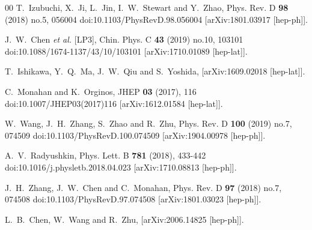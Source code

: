 \documentclass[preprint,12pt]{elsarticle}
\begin{document}
\begin{thebibliography}{00}
T.~Izubuchi, X.~Ji, L.~Jin, I.~W.~Stewart and Y.~Zhao,
Phys. Rev. D \textbf{98} (2018) no.5, 056004
doi:10.1103/PhysRevD.98.056004
[arXiv:1801.03917 [hep-ph]].

J.~W.~Chen \textit{et al.} [LP3],
Chin. Phys. C \textbf{43} (2019) no.10, 103101
doi:10.1088/1674-1137/43/10/103101
[arXiv:1710.01089 [hep-lat]].

T.~Ishikawa, Y.~Q.~Ma, J.~W.~Qiu and S.~Yoshida,
[arXiv:1609.02018 [hep-lat]].

C.~Monahan and K.~Orginos,
JHEP \textbf{03} (2017), 116
doi:10.1007/JHEP03(2017)116
[arXiv:1612.01584 [hep-lat]].

W.~Wang, J.~H.~Zhang, S.~Zhao and R.~Zhu,
Phys. Rev. D \textbf{100} (2019) no.7, 074509
doi:10.1103/PhysRevD.100.074509
[arXiv:1904.00978 [hep-ph]].

A.~V.~Radyushkin,
Phys. Lett. B \textbf{781} (2018), 433-442
doi:10.1016/j.physletb.2018.04.023
[arXiv:1710.08813 [hep-ph]].

J.~H.~Zhang, J.~W.~Chen and C.~Monahan,
Phys. Rev. D \textbf{97} (2018) no.7, 074508
doi:10.1103/PhysRevD.97.074508
[arXiv:1801.03023 [hep-ph]].

L.~B.~Chen, W.~Wang and R.~Zhu,
[arXiv:2006.14825 [hep-ph]].


\end{thebibliography}
\end{document}
